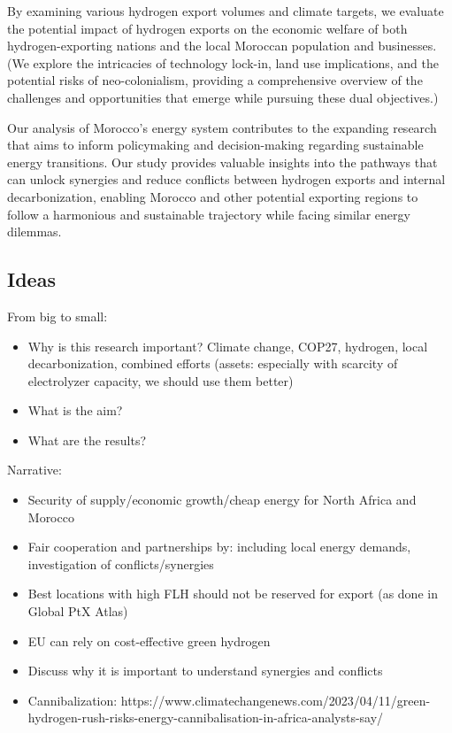 By examining various hydrogen export volumes and climate targets, we evaluate the potential impact of hydrogen exports on the economic welfare of both hydrogen-exporting nations and the local Moroccan population and businesses. (We explore the intricacies of technology lock-in, land use implications, and the potential risks of neo-colonialism, providing a comprehensive overview of the challenges and opportunities that emerge while pursuing these dual objectives.)

Our analysis of Morocco's energy system contributes to the expanding research that aims to inform policymaking and decision-making regarding sustainable energy transitions. Our study provides valuable insights into the pathways that can unlock synergies and reduce conflicts between hydrogen exports and internal decarbonization, enabling Morocco and other potential exporting regions to follow a harmonious and sustainable trajectory while facing similar energy dilemmas.


\subsection{Ideas}
From big to small:
\begin{itemize}
    \item Why is this research important? Climate change, COP27, hydrogen, local decarbonization, combined efforts (assets: especially with scarcity of electrolyzer capacity, we should use them better)
    \item What is the aim?
    \item What are the results?
\end{itemize}

Narrative: 
\begin{itemize}
    \item Security of supply/economic growth/cheap energy for North Africa and Morocco
    \item Fair cooperation and partnerships by: including local energy demands, investigation of conflicts/synergies
    \item Best locations with high FLH should not be reserved for export (as done in Global PtX Atlas)
    \item EU can rely on cost-effective green hydrogen
    \item Discuss why it is important to understand synergies and conflicts
    \item Cannibalization: https://www.climatechangenews.com/2023/04/11/green-hydrogen-rush-risks-energy-cannibalisation-in-africa-analysts-say/
\end{itemize}

